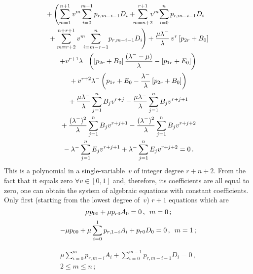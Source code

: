 \begin{multicols}{2}
\noindent
\begin{multline*}
\hspace*{-3mm}{} + \left(
\sum\limits_{m=1}^{n+1} v^{m}\! \sum\limits_{i=0}^{m-1} p_{r,m-i-1} D_i
+\!\!\!\sum\limits_{m=n+2}^{r+1}\! \!\!v^{m} \!\sum\limits_{i=0}^{n} p_{r,m-i-1} D_i\right.\\
\left.{}+ \sum\limits_{m=r+2}^{n+r+1} v^{m}\!\! \!
\sum\limits_{i=m-r-1}^{n}\! p_{r,m-i-1} D_i\!
\right)
 +
\fr{\mu \lambda^-}{\lambda}\,v^r \left[
p_{2r}+B_0\right ]\\
+v^{r+1} \lambda^- \left (
\left[p_{2r} + B_0\right] \fr{(\lambda^- - \mu) }{\lambda}
-\left[p_{1r} + E_0\right] \right) \\
{}+ v^{r+2} \lambda^- \left (
p_{1r} + E_0 - \fr{\lambda^-}{\lambda} \left[ p_{2r} + B_0\right]
\right)\\
{}+ \fr{\mu \lambda^-}{\lambda} \sum\limits_{j=1}^n B_j v^{r+j} 
-
\fr{\mu \lambda^-  }{\lambda} \sum\limits_{j=1}^n
B_j v^{r+j+1}\\
{} + \fr{(\lambda^-)^2  }{\lambda} \sum\limits_{j=1}^n B_j v^{r+j+1}
-\fr{(\lambda^-)^2 }{\lambda} \sum\limits_{j=1}^n B_j v^{r+j+2} 
\\
{}-
\lambda^- \sum\limits_{j=1}^n  E_j v^{r+j+1} +  \lambda^- \sum\limits_{j=1}^n  E_j v^{r+j+2}
=0\,.
\end{multline*}
This is a polynomial in a single-variable~$v$ of integer degree $r+n+2$.
From the fact that it equals zero $\forall v \in [0,1]$ and,
therefore, its coefficients are all equal to zero,
one can obtain the system of algebraic equations with constant coefficients. 
Only
first (starting from the lowest degree of~$v$) $r+1$ equations which are
\begin{equation}
\label{sys2}
\mu p_{00} + \mu p_{r0} A_0=0\,, \enskip m=0\,;
\end{equation}
\begin{equation}
\label{sys2a}
-\mu p_{00} + \mu  \sum\limits_{i=0}^{1} p_{r,1-i} A_i +
p_{r0} D_0 =0\,, \enskip m=1\,; 
\end{equation}

\vspace*{-12pt}

\noindent
\begin{multline}
\label{sys2b}
\mu \sum\limits_{i=0}^{m} p_{r,m-i} A_i + \sum\limits_{i=0}^{m-1} p_{r,m-i-1} D_i
=0\,, \\ 2 \le m \le n\,;
\end{multline}

\vspace*{-12pt}


\end{multicols}
